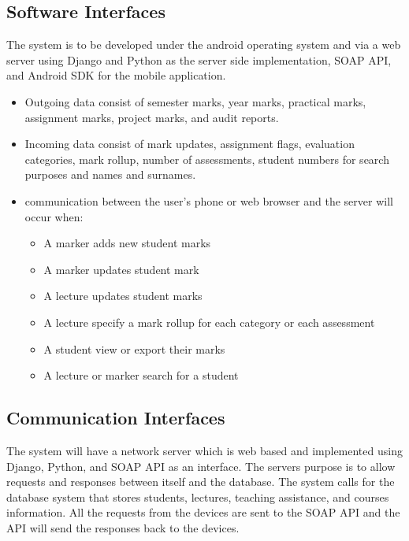 \documentclass[10pt,a4paper]{article}
\begin{document}
\subsection{Software Interfaces}
\label{Software Interfaces}

The system is to be developed under the android operating system and via a web server using Django and Python as the server side implementation, SOAP API, and Android SDK for the mobile application.
\begin{itemize}
\item Outgoing data consist of semester marks, year marks, practical marks, assignment marks, project marks, and audit reports.
\item Incoming data consist of mark updates, assignment flags, evaluation categories, mark rollup, number of assessments, student numbers for search purposes and names and surnames.

\item communication between the user's phone or web browser and the server will occur when:

\begin{itemize}
\item A marker adds new student marks
\item A marker updates student mark
\item A lecture updates student marks
\item A lecture specify a mark rollup for each category or each assessment
\item A student view or export their marks
\item A lecture or marker search for a student

\end{itemize}
\end{itemize}

\subsection{Communication Interfaces}
\label{Communication Interfaces}
The system will have a network server which is web based and implemented using Django, Python, and SOAP API as an interface.
The servers purpose is to allow requests and responses between itself and the database. 
The system calls for the database system that stores students, lectures, teaching assistance, and courses information.
All the requests from the devices are sent to the SOAP API and the API will send the responses back to the devices.
\end{document}
